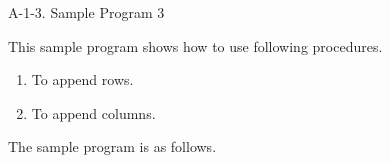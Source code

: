 \vspace*{20mm}

\noindent
{\Large A-1-3. Sample Program 3}

\vspace*{7mm}

\noindent
This sample program shows how to use following procedures.

\begin{enumerate}
\item To append rows.
\item To append columns.
\end{enumerate}

\vspace*{5mm}

\noindent
The sample program is as follows.

\clearpage

